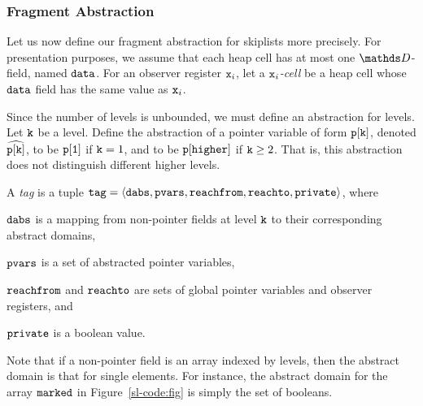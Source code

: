 \vspace*{-0.6cm}
\subsubsection{Fragment Abstraction}
Let us now define our fragment abstraction for skiplists more precisely.
For presentation purposes, we assume that each heap cell has at most one
$\ddomain$-field, named ${\tt data}$.
For an observer register $\mathtt{x}_i$, let a {\em $\mathtt{x}_i$-cell} be a heap cell whose
${\tt data}$ field has the same value as $\mathtt{x}_i$.

Since the number of levels is unbounded, we must define an abstraction for
levels.
Let ${\tt k}$ be a level.
Define the abstraction of a pointer variable of form $\tt p[k]$,
denoted $\widehat{\mathtt{p[k]}}$,
to be $\tt p[1]$ if ${\tt k} = 1$, and to be  $\tt p[higher]$
if ${\tt k} \geq 2$.
That is, this abstraction does not distinguish different higher levels.

A {\em tag} is a tuple $\mathtt{tag} = \left\langle\mathtt{dabs},\mathtt{pvars},\mathtt{reachfrom},\mathtt{reachto},\mathtt{private}\right\rangle$, where
\begin{inparaenum}[(i)]
\item
  $\mathtt{dabs}$ is a mapping from non-pointer fields at level ${\tt k}$
  to their corresponding abstract domains,
\item
  $\mathtt{pvars}$ is a set of abstracted pointer variables,
 \item
   $\mathtt{reachfrom}$ and $\mathtt{reachto}$ are sets of global pointer variables and observer registers, and
  \item $\mathtt{private}$ is a boolean value.
\end{inparaenum}
Note that if a non-pointer field is an array indexed by levels, then
the abstract domain is that for single elements. For instance, the abstract
domain for the array ${\tt marked}$ in Figure~\ref{sl-code:fig} is simply the
set of booleans.

